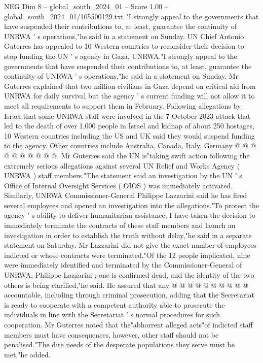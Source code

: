 \begin{textsample}{NEG Dim 8 – global\_south\_2024\_01 – Score 1.00 – global\_south\_2024\_01/105500129.txt}  \label{ex:f8_neg_177}
"I strongly appeal to the governments that have suspended their contributions to, at least, guarantee the continuity of UNRWA ' s operations,"he said in a statement on Sunday.
UN Chief Antonio Guterres has appealed to 10 Western countries to reconsider their decision to stop funding the UN ' s agency in Gaza, UNRWA."I strongly appeal to the governments that have suspended their contributions to, at least, guarantee the continuity of UNRWA ' s operations,"he said in a statement on Sunday.
Mr Guterres explained that two million civilians in Gaza depend on critical aid from UNRWA for daily survival but the agency ' s current funding will not allow it to meet all requirements to support them in February.
Following allegations by Israel that some UNRWA staff were involved in the 7 October 2023 attack that led to the death of over 1,000 people in Israel and kidnap of about 250 hostages, 10 Western countries including the US and UK said they would suspend funding to the agency.
Other countries include Australia, Canada, Italy, Germany @ @ @ @ @ @ @ @ @ @.
Mr Guterres said the UN is"taking swift action following the extremely serious allegations against several UN Relief and Works Agency ( UNRWA ) staff members."The statement said an investigation by the UN ' s Office of Internal Oversight Services ( OIOS ) was immediately activated.
Similarly, UNRWA Commissioner-General Philippe Lazzarini said he has fired several employees and opened an investigation into the allegations."To protect the agency ' s ability to deliver humanitarian assistance, I have taken the decision to immediately terminate the contracts of these staff members and launch an investigation in order to establish the truth without delay,"he said in a separate statement on Saturday.
Mr Lazzarini did not give the exact number of employees indicted or whose contracts were terminated."Of the 12 people implicated, nine were immediately identified and terminated by the Commissioner-General of UNRWA, Philippe Lazzarini ; one is confirmed dead, and the identity of the two others is being clarified,"he said.
He assured that any @ @ @ @ @ @ @ @ @ @ accountable, including through criminal prosecution, adding that the Secretariat is ready to cooperate with a competent authority able to prosecute the individuals in line with the Secretariat ' s normal procedures for such cooperation.
Mr Guterres noted that the"abhorrent alleged acts"of indicted staff members must have consequences, however, other staff should not be penalised."The dire needs of the desperate populations they serve must be met,"he added.

\end{textsample}
